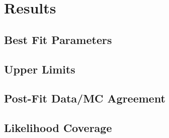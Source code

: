 \section{Results}

\subsection{Best Fit Parameters}

\subsection{Upper Limits}

\subsection{Post-Fit Data/MC Agreement}

\subsection{Likelihood Coverage}
